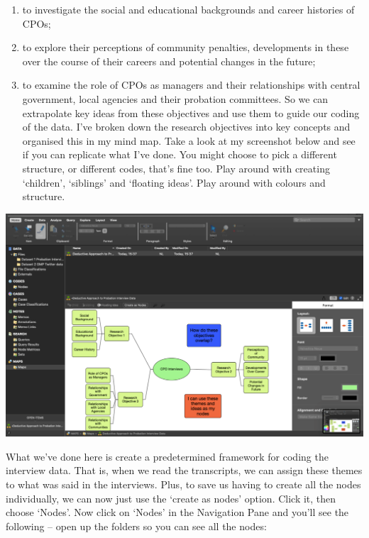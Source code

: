 \documentclass[
]{book}
\providecommand{\tightlist}{%
  \setlength{\itemsep}{0pt}\setlength{\parskip}{0pt}}
\begin{document}
\begin{enumerate}
\def\labelenumi{\arabic{enumi}.}
\tightlist
\item
  to investigate the social and educational backgrounds and career histories of CPOs;
\item
  to explore their perceptions of community penalties, developments in these over the course of their careers and potential changes in the future;
\item
  to examine the role of CPOs as managers and their relationships with central government, local agencies and their probation committees. So we can extrapolate key ideas from these objectives and use them to guide our coding of the data. I've broken down the research objectives into key concepts and organised this in my mind map. Take a look at my screenshot below and see if you can replicate what I've done. You might choose to pick a different structure, or different codes, that's fine too. Play around with creating `children', `siblings' and `floating ideas'. Play around with colours and structure.
\end{enumerate}

\includegraphics{imgs/mindmap2.png}

What we've done here is create a predetermined framework for coding the interview data. That is, when we read the transcripts, we can assign these themes to what was said in the interviews. Plus, to save us having to create all the nodes individually, we can now just use the `create as nodes' option. Click it, then choose `Nodes'. Now click on `Nodes' in the Navigation Pane and you'll see the following -- open up the folders so you can see all the nodes:
\end{document}
